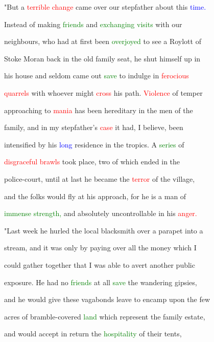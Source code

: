  "But a \textcolor{red}{terrible} \textcolor{red}{change} came over our stepfather about this \textcolor{blue}{time.}

 Instead of making \textcolor{green}{friends} and \textcolor{green}{exchanging} \textcolor{green}{visits} with our

 neighbours, who had at first been \textcolor{green}{overjoyed} to see a Roylott of

 Stoke Moran back in the old family seat, he shut himself up in

 his house and seldom came out \textcolor{green}{save} to indulge in \textcolor{red}{ferocious}

 \textcolor{red}{quarrels} with whoever might \textcolor{red}{cross} his path. \textcolor{red}{Violence} of temper

 approaching to \textcolor{red}{mania} has been hereditary in the men of the

 family, and in my stepfather's \textcolor{red}{case} it had, I believe, been

 intensified by his \textcolor{blue}{long} residence in the tropics. A \textcolor{green}{series} of

 \textcolor{red}{disgraceful} \textcolor{red}{brawls} took place, two of which ended in the

 police-court, until at last he became the \textcolor{red}{terror} of the village,

 and the folks would fly at his approach, for he is a man of

 \textcolor{green}{immense} \textcolor{green}{strength,} and absolutely \textcolor{BurntOrange}{uncontrollable} in his \textcolor{red}{anger.}



 "Last week he hurled the local blacksmith over a parapet into a

 stream, and it was only by \textcolor{BurntOrange}{paying} over all the \textcolor{BurntOrange}{money} which I

 could gather together that I was able to avert another \textcolor{BurntOrange}{public}

 exposure. He had no \textcolor{green}{friends} at all \textcolor{green}{save} the wandering gipsies,

 and he would give these vagabonds \textcolor{BurntOrange}{leave} to encamp upon the few

 acres of bramble-covered \textcolor{green}{land} which represent the family estate,

 and would accept in return the \textcolor{green}{hospitality} of their tents,

